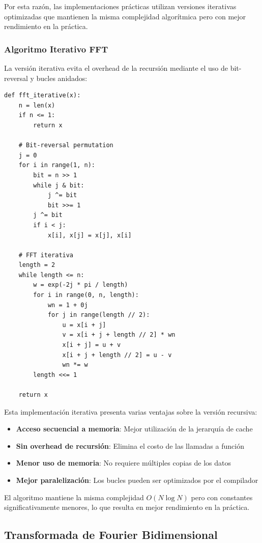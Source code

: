 \documentclass[a4paper]{article}
\begin{document}
Por esta razón, las implementaciones prácticas utilizan versiones iterativas optimizadas que mantienen la misma complejidad algorítmica pero con mejor rendimiento en la práctica.

\subsubsection{Algoritmo Iterativo FFT}

La versión iterativa evita el overhead de la recursión mediante el uso de bit-reversal y bucles anidados:

\begin{verbatim}
def fft_iterative(x):
    n = len(x)
    if n <= 1:
        return x
    
    # Bit-reversal permutation
    j = 0
    for i in range(1, n):
        bit = n >> 1
        while j & bit:
            j ^= bit
            bit >>= 1
        j ^= bit
        if i < j:
            x[i], x[j] = x[j], x[i]
    
    # FFT iterativa
    length = 2
    while length <= n:
        w = exp(-2j * pi / length)
        for i in range(0, n, length):
            wn = 1 + 0j
            for j in range(length // 2):
                u = x[i + j]
                v = x[i + j + length // 2] * wn
                x[i + j] = u + v
                x[i + j + length // 2] = u - v
                wn *= w
        length <<= 1
    
    return x
\end{verbatim}

Esta implementación iterativa presenta varias ventajas sobre la versión recursiva:

\begin{itemize}
    \item \textbf{Acceso secuencial a memoria}: Mejor utilización de la jerarquía de cache
    \item \textbf{Sin overhead de recursión}: Elimina el costo de las llamadas a función
    \item \textbf{Menor uso de memoria}: No requiere múltiples copias de los datos
    \item \textbf{Mejor paralelización}: Los bucles pueden ser optimizados por el compilador
\end{itemize}

El algoritmo mantiene la misma complejidad $O(N \log N)$ pero con constantes significativamente menores, lo que resulta en mejor rendimiento en la práctica.

\subsection{Transformada de Fourier Bidimensional}
\end{document}
